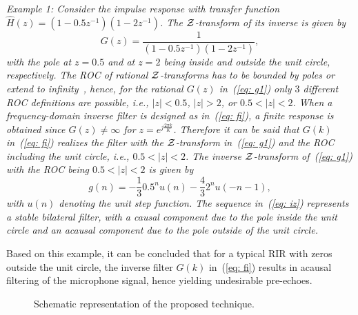 \documentclass{article}
\begin{document}
{\it{Example 1: Consider the impulse response with transfer function $\hat{H}(z) = (1-0.5z^{-1})(1-2z^{-1})$. 
The $\cal{Z}$-transform of its inverse is given by
\begin{equation}
\label{eq: g1}
G(z) = \frac{1}{(1-0.5z^{-1})(1-2z^{-1})},
\end{equation}
with the pole at $z = 0.5$ and at $z = 2$ being inside and outside the unit circle, respectively.
The ROC of rational $\cal{Z}$-transforms has to be bounded by poles or extend to infinity~\cite{oppenheim_1996}, hence, for the rational $G(z)$ in~(\ref{eq: g1}) only $3$ different ROC definitions are possible, i.e., $|z|< 0.5$, $|z|> 2$, or $0.5<|z|< 2$.
When a frequency-domain inverse filter is designed as in~(\ref{eq: fi}), a finite response is obtained since $G(z) \neq \infty$ for $z = e^{j\frac{2 \pi k}{K}}$.
Therefore it can be said that $G(k)$ in~(\ref{eq: fi}) realizes the filter with the $\cal{Z}$-transform in~(\ref{eq: g1}) and the ROC including the unit circle, i.e., $0.5 < |z| < 2$.
The inverse $\cal{Z}$-transform of~(\ref{eq: g1}) with the ROC being $0.5 < |z| < 2$ is given by~\cite{oppenheim_1996}
\begin{equation}
\label{eq: iz}
g(n) = -\frac{1}{3} 0.5^n u(n) - \frac{4}{3} 2^n u(-n-1),
\end{equation}
with $u(n)$ denoting the unit step function. 
The sequence in~(\ref{eq: iz}) represents a stable bilateral filter, with a causal component due to the pole inside the unit circle and an acausal component due to the pole outside of the unit circle.}}

Based on this example, it can be concluded that for a typical RIR with zeros outside the unit circle, the inverse filter $G(k)$ in~(\ref{eq: fi}) results in acausal filtering of the microphone signal, hence yielding undesirable pre-echoes.

\begin{figure}[b!]
  \centering
{}
  \caption{Schematic representation of the proposed technique.}
  \label{fig: al_sche}
\end{figure}
\end{document}
